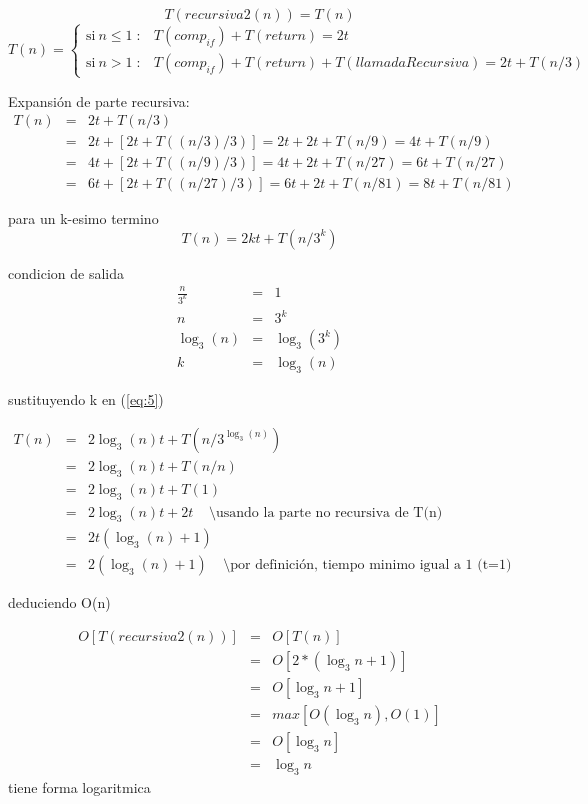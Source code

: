 \[ T(recursiva2(n))=T(n)\]
$$$$
\begin{equation*}
  \label{eq:definicion-por-partes2}
  T(n) = \left\{
    \begin{array}{ll}
      \mathrm{si\ } n \le 1 \; :    &  T(comp_{if})+T(return)=2t\\
      \mathrm{si\ } n > 1 \; : &  T(comp_{if})+T(return)+T(llamadaRecursiva)=2t+T(n/3)
    \end{array}
  \right.
\end{equation*}

Expansión de parte recursiva:
\begin{eqnarray*}
  \label{eq:4}
  T(n)&=&2t+T(n/3)\\
      &=&2t+[2t+T((n/3)/3)]=2t+2t+T(n/9)=4t+T(n/9)\\
      &=&4t+[2t+T((n/9)/3)]=4t+2t+T(n/27)=6t+T(n/27)\\
      &=&6t+[2t+T((n/27)/3)]=6t+2t+T(n/81)=8t+T(n/81)
\end{eqnarray*}

para un k-esimo termino
\begin{equation}
  \label{eq:5}
  T(n)=2kt+T(n/3^k)
\end{equation}

condicion de salida
\begin{eqnarray*}
  \label{eq:6}
  \frac{n}{3^k}&=&1\\
  n&=&3^k\\
  \log_{3}(n)&=&\log_{3}(3^k)\\
  k&=&\log_{3}(n)
\end{eqnarray*}

sustituyendo k en (\ref{eq:5})

\begin{eqnarray*}
  T(n)&=&2\log_{3}(n)t+T(n/3^{\log_{3}(n)})\\
  &=&2\log_{3}(n)t+T(n/n)\\
  &=&2\log_{3}(n)t+T(1)\\
  &=&2\log_{3}(n)t+2t \;\;\;\;  \setminus \text{usando la parte no recursiva de T(n)}\\
  &=&2t(\log_{3}(n)+1)\\
  &=&2(\log_{3}(n)+1)\;\;\;\;  \setminus \text{por definición, tiempo minimo igual a 1 (t=1)}
\end{eqnarray*}

deduciendo O(n)

\begin{eqnarray*}
  O[T(recursiva2(n))]&=&O[T(n)]\\
  &=&O[2*(\log_{3}n+1)]\\
  &=&O[\log_{3}n+1]\\
  &=&max[O(\log_{3}n), O(1)]\\
  &=&O[\log_{3}n]\\
  &=&\log_{3}n
\end{eqnarray*}
tiene forma logaritmica


